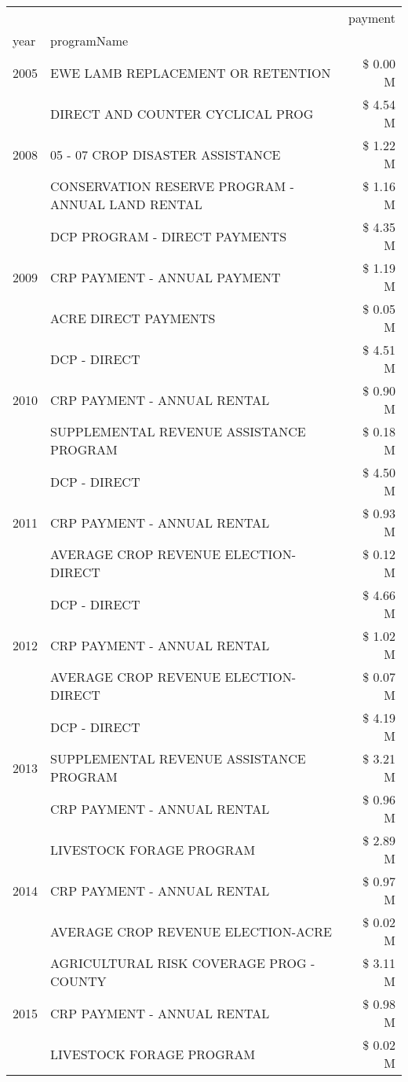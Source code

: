 \begin{tabular}{llr}
\toprule
 &  & payment \\
year & programName &  \\
\midrule
2005 & EWE LAMB REPLACEMENT OR RETENTION & \$ 0.00 M \\
\cline{1-3}
\multirow[t]{3}{*}{2008} & DIRECT AND COUNTER CYCLICAL PROG & \$ 4.54 M \\
 & 05 - 07 CROP DISASTER ASSISTANCE & \$ 1.22 M \\
 & CONSERVATION RESERVE PROGRAM - ANNUAL LAND RENTAL & \$ 1.16 M \\
\cline{1-3}
\multirow[t]{3}{*}{2009} & DCP PROGRAM - DIRECT PAYMENTS & \$ 4.35 M \\
 & CRP PAYMENT - ANNUAL PAYMENT & \$ 1.19 M \\
 & ACRE DIRECT PAYMENTS & \$ 0.05 M \\
\cline{1-3}
\multirow[t]{3}{*}{2010} & DCP - DIRECT & \$ 4.51 M \\
 & CRP PAYMENT - ANNUAL RENTAL & \$ 0.90 M \\
 & SUPPLEMENTAL REVENUE ASSISTANCE PROGRAM & \$ 0.18 M \\
\cline{1-3}
\multirow[t]{3}{*}{2011} & DCP - DIRECT & \$ 4.50 M \\
 & CRP PAYMENT - ANNUAL RENTAL & \$ 0.93 M \\
 & AVERAGE CROP REVENUE ELECTION-DIRECT & \$ 0.12 M \\
\cline{1-3}
\multirow[t]{3}{*}{2012} & DCP - DIRECT & \$ 4.66 M \\
 & CRP PAYMENT - ANNUAL RENTAL & \$ 1.02 M \\
 & AVERAGE CROP REVENUE ELECTION-DIRECT & \$ 0.07 M \\
\cline{1-3}
\multirow[t]{3}{*}{2013} & DCP - DIRECT & \$ 4.19 M \\
 & SUPPLEMENTAL REVENUE ASSISTANCE PROGRAM & \$ 3.21 M \\
 & CRP PAYMENT - ANNUAL RENTAL & \$ 0.96 M \\
\cline{1-3}
\multirow[t]{3}{*}{2014} & LIVESTOCK FORAGE PROGRAM & \$ 2.89 M \\
 & CRP PAYMENT - ANNUAL RENTAL & \$ 0.97 M \\
 & AVERAGE CROP REVENUE ELECTION-ACRE & \$ 0.02 M \\
\cline{1-3}
\multirow[t]{3}{*}{2015} & AGRICULTURAL RISK COVERAGE PROG - COUNTY & \$ 3.11 M \\
 & CRP PAYMENT - ANNUAL RENTAL & \$ 0.98 M \\
 & LIVESTOCK FORAGE PROGRAM & \$ 0.02 M \\

\end{tabular}
